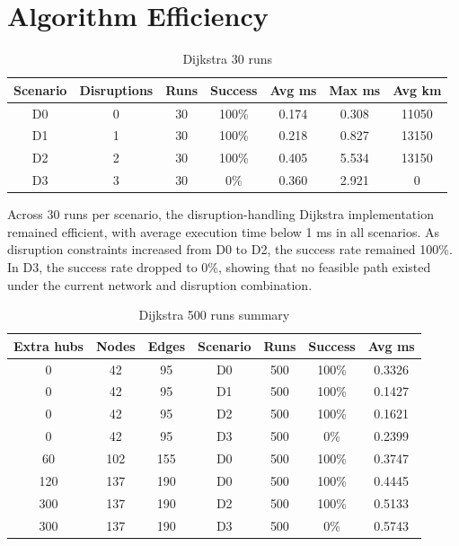 \section{Algorithm Efficiency}

\begin{table}[H]
\centering
\caption{Dijkstra 30 runs}
\begin{tabular}{ccccccc}
\toprule
\textbf{Scenario} & \textbf{Disruptions} & \textbf{Runs} & \textbf{Success} & \textbf{Avg ms} & \textbf{Max ms} & \textbf{Avg km}\\
\midrule
D0 & 0 & 30 & 100\% & 0.174 & 0.308 & 11050\\
D1 & 1 & 30 & 100\% & 0.218 & 0.827 & 13150\\
D2 & 2 & 30 & 100\% & 0.405 & 5.534 & 13150\\
D3 & 3 & 30 & 0\% & 0.360 & 2.921 & 0\\
\bottomrule
\end{tabular}
\end{table}

Across 30 runs per scenario, the disruption-handling Dijkstra implementation remained efficient, with average execution time below 1 ms in all scenarios. As disruption constraints increased from D0 to D2, the success rate remained 100\%. In D3, the success rate dropped to 0\%, showing that no feasible path existed under the current network and disruption combination.

\begin{table}[H]
\centering
\caption{Dijkstra 500 runs summary}
\begin{tabular}{ccccccc}
\toprule
\textbf{Extra hubs} & \textbf{Nodes} & \textbf{Edges} & \textbf{Scenario} & \textbf{Runs} & \textbf{Success} & \textbf{Avg ms}\\
\midrule
0 & 42 & 95 & D0 & 500 & 100\% & 0.3326\\
0 & 42 & 95 & D1 & 500 & 100\% & 0.1427\\
0 & 42 & 95 & D2 & 500 & 100\% & 0.1621\\
0 & 42 & 95 & D3 & 500 & 0\% & 0.2399\\
60 & 102 & 155 & D0 & 500 & 100\% & 0.3747\\
120 & 137 & 190 & D0 & 500 & 100\% & 0.4445\\
300 & 137 & 190 & D2 & 500 & 100\% & 0.5133\\
300 & 137 & 190 & D3 & 500 & 0\% & 0.5743\\
\bottomrule
\end{tabular}
\end{table}

